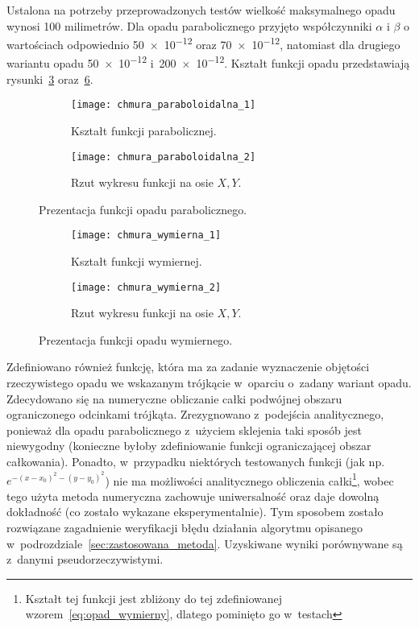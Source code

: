 Ustalona na potrzeby przeprowadzonych testów wielkość maksymalnego opadu wynosi 100 milimetrów. Dla opadu parabolicznego przyjęto współczynniki $\alpha$ i $\beta$ o wartościach odpowiednio \num{50e-12} oraz \num{70e-12}, natomiast dla drugiego wariantu opadu \num{50e-12} i~\num{200e-12}. Kształt funkcji opadu przedstawiają rysunki~\ref{fig:opad_paraboliczny} oraz~\ref{fig:opad_wymierny}. 

\begin{figure}[!ht]
\centering
	\begin{subfigure}{1\textwidth}
		\centering
		\texttt{[image: chmura\_paraboloidalna\_1]}
		\caption{Kształt funkcji parabolicznej.}
		\label{fig:parabola_3d}
	\end{subfigure}	
	\begin{subfigure}{1\textwidth}
		\centering
		\texttt{[image: chmura\_paraboloidalna\_2]}
		\caption{Rzut wykresu funkcji na osie $X, Y$.}
		\label{fig:parabola_2d}
	\end{subfigure}	
\caption{Prezentacja funkcji opadu parabolicznego.}
\label{fig:opad_paraboliczny}
\end{figure}

\begin{figure}[!ht]
	\begin{subfigure}{1\textwidth}
		\centering
		\texttt{[image: chmura\_wymierna\_1]}
		\caption{Kształt funkcji wymiernej.}
		\label{fig:wymierna_3d}
	\end{subfigure}	
	\begin{subfigure}{1\textwidth}
		\centering
		\texttt{[image: chmura\_wymierna\_2]}
		\caption{Rzut wykresu funkcji na osie $X, Y$.}
		\label{fig:wymierna_2d}
	\end{subfigure}	
\caption{Prezentacja funkcji opadu wymiernego.}
\label{fig:opad_wymierny}
\end{figure}

Zdefiniowano również funkcję, która ma za zadanie wyznaczenie objętości rzeczywistego opadu we wskazanym trójkącie w~oparciu o~zadany wariant opadu. Zdecydowano się na numeryczne obliczanie całki podwójnej obszaru ograniczonego odcinkami trójkąta. Zrezygnowano z~podejścia analitycznego, ponieważ dla opadu parabolicznego z~użyciem sklejenia taki sposób jest niewygodny (konieczne byłoby zdefiniowanie funkcji ograniczającej obszar całkowania). Ponadto, w~przypadku niektórych testowanych funkcji (jak np. $e^{-(x-x_0)^2 - (y-y_0)^2}$) nie ma możliwości analitycznego obliczenia całki\footnote{Kształt tej funkcji jest zbliżony do tej zdefiniowanej wzorem~\ref{eq:opad_wymierny}, dlatego pominięto go w~testach}, wobec tego użyta metoda numeryczna zachowuje uniwersalność oraz daje dowolną dokładność (co zostało wykazane eksperymentalnie). Tym sposobem zostało rozwiązane zagadnienie weryfikacji błędu działania algorytmu opisanego w~podrozdziale~\ref{sec:zastosowana_metoda}. Uzyskiwane wyniki porównywane są z~danymi pseudorzeczywistymi.



